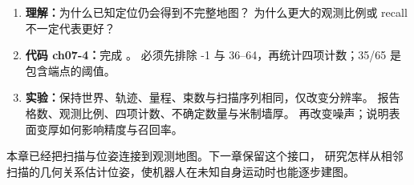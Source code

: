 \par\noindent\begin{minipage}{\linewidth}

\end{minipage}\par

\begin{enumerate}
\item \textbf{理解：}为什么已知定位仍会得到不完整地图？
  为什么更大的观测比例或 recall 不一定代表更好？
\item \textbf{代码 ch07-4：}完成 。
  必须先排除 -1 与 36--64，再统计四项计数；35/65 是包含端点的阈值。
\item \textbf{实验：}保持世界、轨迹、量程、束数与扫描序列相同，仅改变分辨率。
  报告格数、观测比例、四项计数、不确定数量与米制墙厚。
  再改变噪声；说明表面变厚如何影响精度与召回率。
\end{enumerate}

本章已经把扫描与位姿连接到观测地图。下一章保留这个接口，
研究怎样从相邻扫描的几何关系估计位姿，使机器人在未知自身运动时也能逐步建图。
